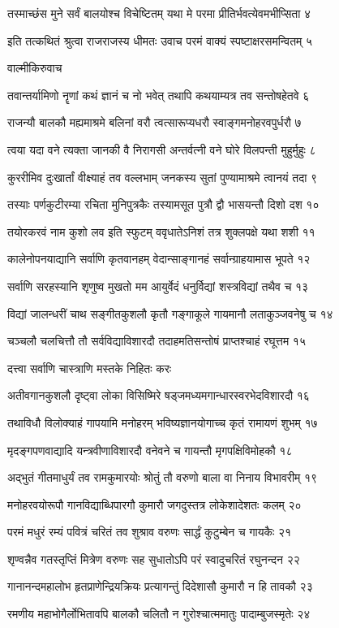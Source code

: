 तस्माच्छंस मुने सर्वं बालयोश्च विचेष्टितम्
यथा मे परमा प्रीतिर्भवत्येवमभीप्सिता ४

इति तत्कथितं श्रुत्वा राजराजस्य धीमतः
उवाच परमं वाक्यं स्पष्टाक्षरसमन्वितम् ५

वाल्मीकिरुवाच

तवान्तर्यामिणो नॄणां कथं ज्ञानं च नो भवेत्
तथापि कथयाम्यत्र तव सन्तोषहेतवे ६

राजन्यौ बालकौ मह्यमाश्रमे बलिनां वरौ
त्वत्सारूप्यधरौ स्वाङ्गमनोहरवपुर्धरौ ७

त्वया यदा वने त्यक्ता जानकी वै निरागसी
अन्तर्वत्नी वने घोरे विलपन्ती मुहुर्मुहुः ८

कुररीमिव दुःखार्तां वीक्ष्याहं तव वल्लभाम्
जनकस्य सुतां पुण्यामाश्रमे त्वानयं तदा ९

तस्याः पर्णकुटीरम्या रचिता मुनिपुत्रकैः
तस्यामसूत पुत्रौ द्वौ भासयन्तौ दिशो दश १०

तयोरकरवं नाम कुशो लव इति स्फुटम्
ववृधातेऽनिशं तत्र शुक्लपक्षे यथा शशी ११

कालेनोपनयाद्यानि सर्वाणि कृतवानहम्
वेदान्साङ्गानहं सर्वान्ग्राहयामास भूपते १२

सर्वाणि सरहस्यानि शृणुष्व मुखतो मम
आयुर्वेदं धनुर्विद्यां शस्त्रविद्यां तथैव च १३

विद्यां जालन्धरीं चाथ सङ्गीतकुशलौ कृतौ
गङ्गाकूले गायमानौ लताकुञ्जवनेषु च १४

चञ्चलौ चलचित्तौ तौ सर्वविद्याविशारदौ
तदाहमतिसन्तोषं प्राप्तश्चाहं रघूत्तम १५

दत्त्वा सर्वाणि चास्त्राणि मस्तके निहितः करः

अतीवगानकुशलौ दृष्ट्वा लोका विसिष्मिरे
षड्जमध्यमगान्धारस्वरभेदविशारदौ १६

तथाविधौ विलोक्याहं गापयामि मनोहरम्
भविष्यज्ञानयोगाच्च कृतं रामायणं शुभम् १७

मृदङ्गपणवाद्यादि यन्त्रवीणाविशारदौ
वनेवने च गायन्तौ मृगपक्षिविमोहकौ १८

अद्भुतं गीतमाधुर्यं तव रामकुमारयोः
श्रोतुं तौ वरुणो बाला वा निनाय विभावरीम् १९

मनोहरवयोरूपौ गानविद्याब्धिपारगौ
कुमारौ जगदुस्तत्र लोकेशादेशतः कलम् २०

परमं मधुरं रम्यं पवित्रं चरितं तव
शुश्राव वरुणः सार्द्धं कुटुम्बेन च गायकैः २१

शृण्वन्नैव गतस्तृप्तिं मित्रेण वरुणः सह
सुधातोऽपि परं स्वादुचरितं रघुनन्दन २२

गानानन्दमहालोभ हृतप्राणेन्द्रियक्रियः
प्रत्यागन्तुं दिदेशासौ कुमारौ न हि तावकौ २३

रमणीय महाभोगैर्लोभितावपि बालकौ
चलितौ न गुरोश्चात्ममातुः पादाम्बुजस्मृतेः २४

